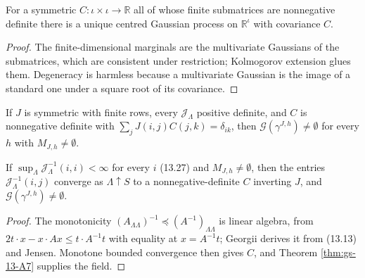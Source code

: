 \begin{theorem}[Georgii (13.A7)]
    \label{thm:gs-13-A7}
    \leanok

    For a symmetric $C : \iota \times \iota \to \mathbb R$ all of whose finite submatrices are
    nonnegative definite there is a unique centred Gaussian process on $\mathbb R^\iota$ with
    covariance $C$.
\end{theorem}
\begin{proof}
    \leanok
    The finite-dimensional marginals are the multivariate Gaussians of the submatrices, which are
    consistent under restriction; Kolmogorov extension glues them. Degeneracy is harmless because
    a multivariate Gaussian is the image of a standard one under a square root of its covariance.
\end{proof}

\begin{corollary}
    \label{cor:gs-13-26}
    \leanok

    If $J$ is symmetric with finite rows, every $\mathcal J_\Lambda$ positive definite, and $C$ is
    nonnegative definite with $\sum_j J(i,j)C(j,k) = \delta_{ik}$, then
    $\mathcal G(\gamma^{J,h}) \neq \emptyset$ for every $h$ with $M_{J,h} \neq \emptyset$.
\end{corollary}

\begin{theorem}[Georgii (13.26), (13.27)]
    \label{thm:gs-13-27}
    \leanok

    If $\sup_\Lambda \mathcal J_\Lambda^{-1}(i,i) < \infty$ for every $i$ (13.27) and
    $M_{J,h} \neq \emptyset$, then the entries $\mathcal J_\Lambda^{-1}(i,j)$ converge as
    $\Lambda \uparrow S$ to a nonnegative-definite $C$ inverting $J$, and
    $\mathcal G(\gamma^{J,h}) \neq \emptyset$.
\end{theorem}
\begin{proof}
    \leanok
    The monotonicity $(A_{\Lambda\Lambda})^{-1} \preceq (A^{-1})_{\Lambda\Lambda}$ is linear
    algebra, from $2t\cdot x - x\cdot Ax \leq t\cdot A^{-1}t$ with equality at $x = A^{-1}t$;
    Georgii derives it from (13.13) and Jensen. Monotone bounded convergence then gives $C$, and
    Theorem \ref{thm:gs-13-A7} supplies the field.
\end{proof}

